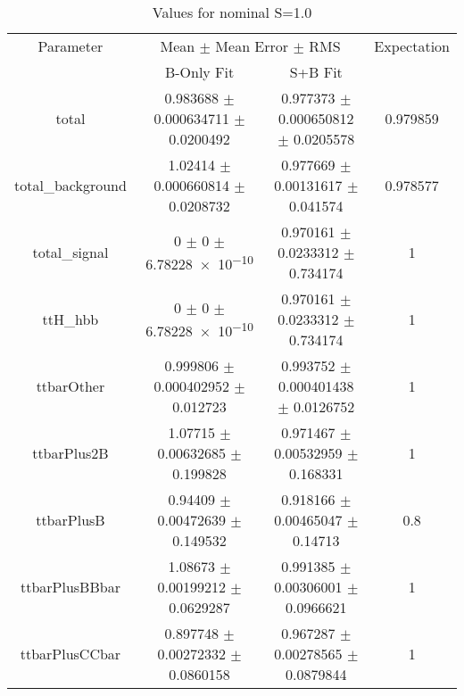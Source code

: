 \begin{table}
\centering
\caption{Values for nominal S=1.0}
\begin{tabular}{cccc}
\toprule
Parameter & \multicolumn{2}{c}{Mean $\pm$ Mean Error $\pm$ RMS} & Expectation\\
 & B-Only Fit & S+B Fit & \\
\midrule
total & \num{0.983688} $\pm$ \num{0.000634711} $\pm$ \num{0.0200492} & \num{0.977373} $\pm$ \num{0.000650812} $\pm$ \num{0.0205578} & \num{0.979859}\\
total\_background & \num{1.02414} $\pm$ \num{0.000660814} $\pm$ \num{0.0208732} & \num{0.977669} $\pm$ \num{0.00131617} $\pm$ \num{0.041574} & \num{0.978577}\\
total\_signal & \num{0} $\pm$ \num{0} $\pm$ \num{6.78228e-10} & \num{0.970161} $\pm$ \num{0.0233312} $\pm$ \num{0.734174} & \num{1}\\
ttH\_hbb & \num{0} $\pm$ \num{0} $\pm$ \num{6.78228e-10} & \num{0.970161} $\pm$ \num{0.0233312} $\pm$ \num{0.734174} & \num{1}\\
ttbarOther & \num{0.999806} $\pm$ \num{0.000402952} $\pm$ \num{0.012723} & \num{0.993752} $\pm$ \num{0.000401438} $\pm$ \num{0.0126752} & \num{1}\\
ttbarPlus2B & \num{1.07715} $\pm$ \num{0.00632685} $\pm$ \num{0.199828} & \num{0.971467} $\pm$ \num{0.00532959} $\pm$ \num{0.168331} & \num{1}\\
ttbarPlusB & \num{0.94409} $\pm$ \num{0.00472639} $\pm$ \num{0.149532} & \num{0.918166} $\pm$ \num{0.00465047} $\pm$ \num{0.14713} & \num{0.8}\\
ttbarPlusBBbar & \num{1.08673} $\pm$ \num{0.00199212} $\pm$ \num{0.0629287} & \num{0.991385} $\pm$ \num{0.00306001} $\pm$ \num{0.0966621} & \num{1}\\
ttbarPlusCCbar & \num{0.897748} $\pm$ \num{0.00272332} $\pm$ \num{0.0860158} & \num{0.967287} $\pm$ \num{0.00278565} $\pm$ \num{0.0879844} & \num{1}\\
\bottomrule
\end{tabular}
\end{table}
